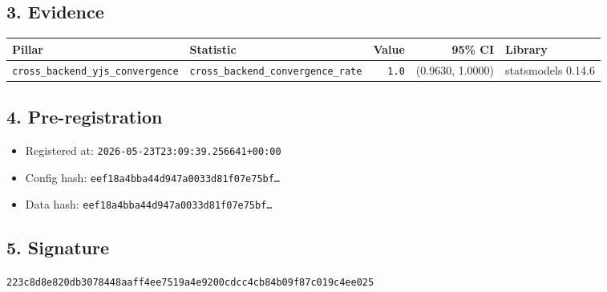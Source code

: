 \documentclass{article}
\begin{document}
\subsection*{3. Evidence}
\begin{tabular}{llrrl}\toprule
\textbf{Pillar} & \textbf{Statistic} & \textbf{Value} & \textbf{95\% CI} & \textbf{Library} \\\midrule
\texttt{cross\_backend\_yjs\_convergence} & \texttt{cross\_backend\_convergence\_rate} & \texttt{1.0} & (0.9630, 1.0000) & statsmodels 0.14.6 \\
\bottomrule\end{tabular}
\subsection*{4. Pre-registration}
\begin{itemize}
\item Registered at: \texttt{2026-05-23T23:09:39.256641+00:00}
\item Config hash: \texttt{eef18a4bba44d947a0033d81f07e75bf\dots}
\item Data hash: \texttt{eef18a4bba44d947a0033d81f07e75bf\dots}
\end{itemize}
\subsection*{5. Signature}
\texttt{223c8d8e820db3078448aaff4ee7519a4e9200cdcc4cb84b09f87c019c4ee025}\\
\end{document}
